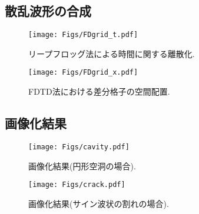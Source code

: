 \subsection{散乱波形の合成}
\begin{figure}[h]
	\begin{center}
	\texttt{[image: Figs/FDgrid\_t.pdf]} 
	\end{center}
	\caption{リープフロッグ法による時間に関する離散化.} 
	\label{fig:leapfrog}
\end{figure}
\begin{figure}[h]
	\begin{center}
	\texttt{[image: Figs/FDgrid\_x.pdf]} 
	\end{center}
	\caption{FDTD法における差分格子の空間配置.} 
	\label{fig:staggered}
\end{figure}
\subsection{画像化結果}
\begin{figure}[h]
	\begin{center}
	\texttt{[image: Figs/cavity.pdf]} 
	\end{center}
	\caption{画像化結果(円形空洞の場合).} 
	\label{fig:cavity}
\end{figure}
\begin{figure}[h]
	\begin{center}
	\texttt{[image: Figs/crack.pdf]} 
	\end{center}
	\caption{画像化結果(サイン波状の割れの場合).} 
	\label{fig:crack}
\end{figure}
